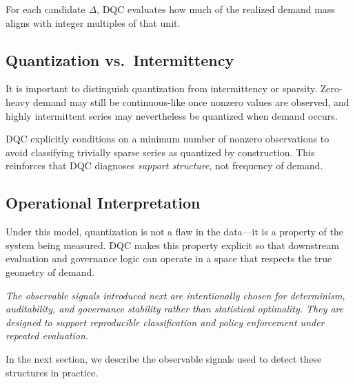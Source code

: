 For each candidate $\Delta$, DQC evaluates how much of the realized demand mass
aligns with integer multiples of that unit.

\subsection{Quantization vs.\ Intermittency}

It is important to distinguish quantization from intermittency or sparsity.
Zero-heavy demand may still be continuous-like once nonzero values are observed,
and highly intermittent series may nevertheless be quantized when demand occurs.

DQC explicitly conditions on a minimum number of nonzero observations to avoid
classifying trivially sparse series as quantized by construction. This reinforces
that DQC diagnoses \emph{support structure}, not frequency of demand.

\subsection{Operational Interpretation}

Under this model, quantization is not a flaw in the data—it is a property of the
system being measured. DQC makes this property explicit so that downstream
evaluation and governance logic can operate in a space that respects the true
geometry of demand.

\emph{The observable signals introduced next are intentionally chosen for
determinism, auditability, and governance stability rather than statistical
optimality. They are designed to support reproducible classification and
policy enforcement under repeated evaluation.}

In the next section, we describe the observable signals used to detect these
structures in practice.
